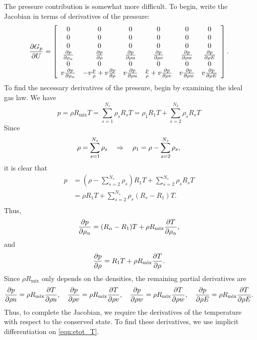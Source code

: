 %
The pressure contribution is somewhat more difficult.  To begin, write
the Jacobian in terms of derivatives of the pressure:
%
\begin{equation*}
\frac{\partial G_p}{\partial U} = \left[ \begin{array}{cccccc}
0 & 0 & 0 & 0 & 0 & 0 \\
0 & 0 & 0 & 0 & 0 & 0 \\
0 & 0 & 0 & 0 & 0 & 0 \\
\frac{\partial p}{\partial \rho_{\alpha}} & \frac{\partial p}{\partial \rho} & \frac{\partial p}{\partial \rho u} & \frac{\partial p}{\partial \rho v} & \frac{\partial p}{\partial \rho w} & \frac{\partial p}{\partial \rho E} \\
0 & 0 & 0 & 0 & 0 & 0 \\
v \frac{\partial p}{\partial \rho_{\alpha}} & -v \frac{p}{\rho} + v \frac{\partial p}{\partial \rho} & v \frac{\partial p}{\partial \rho u} & \frac{p}{\rho} + v \frac{\partial p}{\partial \rho v} & v \frac{\partial p}{\partial \rho w} & v \frac{\partial p}{\partial \rho E} \\
\end{array} \right].
\end{equation*}
%
To find the necessary derivatives of the pressure, begin by examining
the ideal gas law.  We have
%
\begin{equation*}
p = \rho R_{\text{mix}} T = \sum_{s=1}^{N_s} \rho_s R_s T = \rho_1 R_1 T + \sum_{s=2}^{N_2} \rho_s R_s T
\end{equation*}
%
Since
%
\begin{equation*}
\rho = \sum_{s=1}^{N_s} \rho_s \quad \Rightarrow \quad \rho_1 = \rho - \sum_{s=2}^{N_s} \rho_s,
\end{equation*}
%
it is clear that
%
\begin{align*}
p & = \left( \rho - \sum_{s=2}^{N_s} \rho_s \right) R_1 T + \sum_{s=2}^{N_s} \rho_s R_s T \\
& = \rho R_1 T + \sum_{s=2}^{N_s} \rho_s (R_s - R_1) T. \\
\end{align*}
%
Thus,
%
\begin{equation*}
\frac{\partial p}{\partial \rho_{\alpha}} = (R_{\alpha} - R_1) T + \rho R_{\text{mix}} \frac{\partial T}{\partial \rho_{\alpha}},
\end{equation*}
%
and
%
\begin{equation*}
\frac{\partial p}{\partial \rho} = R_1 T + \rho R_{\text{mix}} \frac{\partial T}{\partial \rho}.
\end{equation*}
%
Since $\rho R_{\text{mix}}$ only depends on the densities, the remaining
partial derivatives are
%
\begin{equation*}
\frac{\partial p}{\partial \rho u} = \rho R_{\text{mix}} \frac{\partial T}{\partial \rho u}, \quad
\frac{\partial p}{\partial \rho v} = \rho R_{\text{mix}} \frac{\partial T}{\partial \rho v}, \quad
\frac{\partial p}{\partial \rho w} = \rho R_{\text{mix}} \frac{\partial T}{\partial \rho w}, \quad
\frac{\partial p}{\partial \rho E} = \rho R_{\text{mix}} \frac{\partial T}{\partial \rho E}.
\end{equation*}
%
Thus, to complete the Jacobian, we require the derivatives of the
temperature with respect to the conserved state.  To find these
derivatives, we use implicit differentiation on \eqref{eqn:etot_T}.

